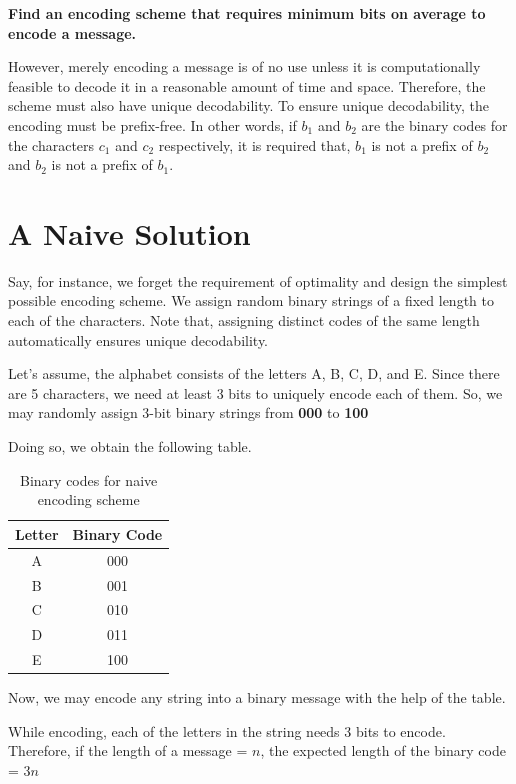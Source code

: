 \documentclass[18pt]{article}
\begin{document}
\textbf{Find an encoding scheme that requires
minimum bits on average to encode a message.}

However, merely encoding a message is of no use unless it is computationally feasible to decode it in a reasonable amount of time and space. Therefore, the scheme must also have unique decodability. To ensure unique decodability, the encoding must be prefix-free. In other words, if $b_1$ and $b_2$ are the binary codes for the characters $c_1$ and $c_2$ respectively, it is required that, $b_1$ is not a prefix of $b_2$ and $b_2$ is not a prefix of $b_1$.



\section{A Naive Solution}

Say, for instance, we forget the requirement of optimality and design the simplest possible encoding scheme. We assign random binary strings of a fixed length to each of the characters. Note that, assigning distinct codes of the same length automatically ensures unique decodability.

Let's assume, the alphabet consists of the letters A, B, C, D, and E. Since there are 5 characters, we need at least 3 bits to uniquely encode each of them. So, we may randomly assign 3-bit binary strings from \textbf{000} to \textbf{100}

Doing so, we obtain the following table.

\begin{table}[h]
	\centering
	\begin{tabular}{|c|c|}
		\hline
		\textbf{Letter} & \textbf{Binary Code} \\
		\hline
		A & 000  \\
		B & 001  \\
		C & 010 \\
		D & 011 \\
		E & 100 \\
						\hline
	\end{tabular}
	\caption{Binary codes for naive encoding scheme}
\end{table}

Now, we may encode any string into a binary message with the help of the table.

While encoding, each of the letters in the string needs 3 bits to encode. Therefore, if the length of a message = $n$, the expected length of the binary code = $3n$
\end{document}
